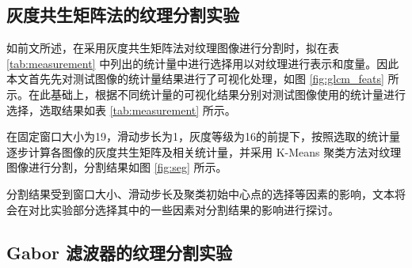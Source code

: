 \subsection{灰度共生矩阵法的纹理分割实验}

如前文所述，在采用灰度共生矩阵法对纹理图像进行分割时，拟在表 \ref{tab:measurement} 中列出的统计量中进行选择用以对纹理进行表示和度量。因此本文首先先对测试图像的统计量结果进行了可视化处理，如图 \ref{fig:glcm_feats} 所示。在此基础上，根据不同统计量的可视化结果分别对测试图像使用的统计量进行选择，选取结果如表 \ref{tab:measurement} 所示。

在固定窗口大小为19，滑动步长为1，灰度等级为16的前提下，按照选取的统计量逐步计算各图像的灰度共生矩阵及相关统计量，并采用 K-Means 聚类方法对纹理图像进行分割，分割结果如图 \ref{fig:seg} 所示。

\begin{figure*}[!ht]
 \centering
  \begin{minipage}[b]{\linewidth} 	
  \end{minipage}
  \vfill
  \caption{灰度共生矩阵的纹理分割结果：(a) Texture\_mosaic\_1, (b) Texture\_mosaic\_2, (c)Texture\_mosaic\_3, (d) Texture\_mosaic\_4.}
  \label{fig:seg}
	
\end{figure*}

分割结果受到窗口大小、滑动步长及聚类初始中心点的选择等因素的影响，文本将会在对比实验部分选择其中的一些因素对分割结果的影响进行探讨。

\subsection{Gabor 滤波器的纹理分割实验}

